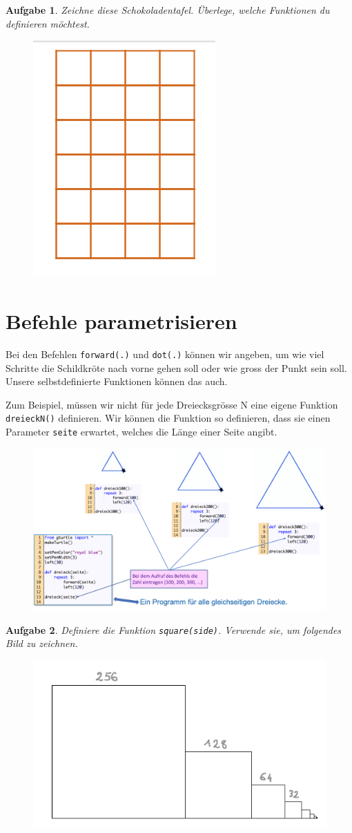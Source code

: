 \documentclass{article}
\newtheorem{aufgabe}{Aufgabe}[section]
\begin{document}
\begin{aufgabe} \label{aufgabe-schokolade}
Zeichne diese Schokoladentafel. Überlege, welche Funktionen du definieren möchtest.
\begin{figure}[H]
\centering
\includegraphics[width=0.2\linewidth]{pictures/picture-schokolade.png}
\end{figure}
\end{aufgabe}


\section{Befehle parametrisieren} \label{section-mit-parameter}

Bei den Befehlen \lstinline|forward(.)| und \lstinline|dot(.)| können wir angeben, um wie viel Schritte die Schildkröte nach vorne gehen soll oder wie gross der Punkt sein soll. Unsere selbstdefinierte Funktionen können das auch.

Zum Beispiel, müssen wir nicht für jede Dreiecksgrösse N eine eigene Funktion \lstinline|dreieckN()| definieren. Wir können die Funktion so definieren, dass sie einen Parameter \lstinline|seite| erwartet, welches die Länge einer Seite angibt.

\begin{figure}[H]
\centering
\includegraphics[width=0.8\linewidth]{pictures/overview_parameters_5.png} 
\end{figure}

\begin{aufgabe} \label{aufgabe-halbe-quadrate}
Definiere die Funktion \lstinline|square(side)|. Verwende sie, um folgendes Bild zu zeichnen.
\begin{figure}[H]
\centering
\includegraphics[width=0.35\linewidth]{pictures/picture-halbe-quadrate.png}
\end{figure}
\end{aufgabe}
\end{document}
